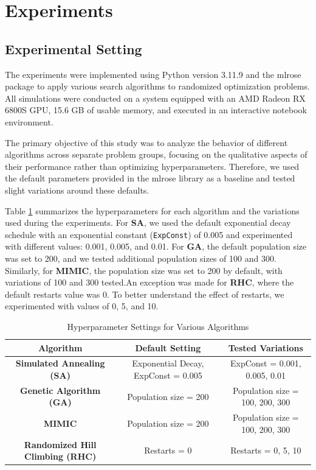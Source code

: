 \section{Experiments}
\subsection{Experimental Setting}
The experiments were implemented using Python version 3.11.9 and the mlrose \cite{Hayes19} package to apply various search algorithms to randomized optimization problems. All simulations were conducted on a system equipped with an AMD Radeon RX 6800S GPU, 15.6 GB of usable memory, and executed in an interactive notebook environment. 

The primary objective of this study was to analyze the behavior of different algorithms across separate problem groups, focusing on the qualitative aspects of their performance rather than optimizing hyperparameters. Therefore, we used the default parameters provided in the mlrose library as a baseline and tested slight variations around these defaults.

Table \ref{tab:hyperparameters} summarizes the hyperparameters for each algorithm and the variations used during the experiments. For \textbf{SA}, we used the default exponential decay schedule with an exponential constant (\texttt{ExpConst}) of 0.005 and experimented with different values: 0.001, 0.005, and 0.01. For \textbf{GA}, the default population size was set to 200, and we tested additional population sizes of 100 and 300. Similarly, for \textbf{MIMIC}, the population size was set to 200 by default, with variations of 100 and 300 tested.An exception was made for \textbf{RHC}, where the default restarts value was 0. To better understand the effect of restarts, we experimented with values of 0, 5, and 10.

\begin{table}[h!]
    \centering
    \caption{Hyperparameter Settings for Various Algorithms}
    \begin{tabular}{|c|c|c|}
        \hline
        \textbf{Algorithm} & \textbf{Default Setting} & \textbf{Tested Variations} \\ \hline
        \textbf{Simulated Annealing (SA)} & Exponential Decay, ExpConst = 0.005 & ExpConst = 0.001, 0.005, 0.01 \\ \hline
        \textbf{Genetic Algorithm (GA)} & Population size = 200 & Population size = 100, 200, 300 \\ \hline
        \textbf{MIMIC} & Population size = 200 & Population size = 100, 200, 300 \\ \hline
        \textbf{Randomized Hill Climbing (RHC)} & Restarts = 0 & Restarts = 0, 5, 10 \\ \hline
    \end{tabular}
    \label{tab:hyperparameters}
\end{table}

